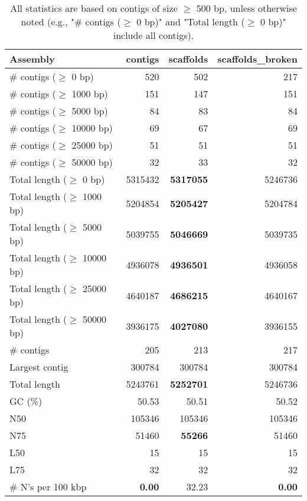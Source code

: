 \documentclass[12pt,a4paper]{article}
\begin{document}
\begin{table}[ht]
\begin{center}
\caption{All statistics are based on contigs of size $\geq$ 500 bp, unless otherwise noted (e.g., "\# contigs ($\geq$ 0 bp)" and "Total length ($\geq$ 0 bp)" include all contigs).}
\begin{tabular}{|l*{3}{|r}|}
\hline
Assembly & contigs & scaffolds & scaffolds\_broken \\ \hline
\# contigs ($\geq$ 0 bp) & 520 & 502 & 217 \\ \hline
\# contigs ($\geq$ 1000 bp) & 151 & 147 & 151 \\ \hline
\# contigs ($\geq$ 5000 bp) & 84 & 83 & 84 \\ \hline
\# contigs ($\geq$ 10000 bp) & 69 & 67 & 69 \\ \hline
\# contigs ($\geq$ 25000 bp) & 51 & 51 & 51 \\ \hline
\# contigs ($\geq$ 50000 bp) & 32 & 33 & 32 \\ \hline
Total length ($\geq$ 0 bp) & 5315432 & {\bf 5317055} & 5246736 \\ \hline
Total length ($\geq$ 1000 bp) & 5204854 & {\bf 5205427} & 5204784 \\ \hline
Total length ($\geq$ 5000 bp) & 5039755 & {\bf 5046669} & 5039735 \\ \hline
Total length ($\geq$ 10000 bp) & 4936078 & {\bf 4936501} & 4936058 \\ \hline
Total length ($\geq$ 25000 bp) & 4640187 & {\bf 4686215} & 4640167 \\ \hline
Total length ($\geq$ 50000 bp) & 3936175 & {\bf 4027080} & 3936155 \\ \hline
\# contigs & 205 & 213 & 217 \\ \hline
Largest contig & 300784 & 300784 & 300784 \\ \hline
Total length & 5243761 & {\bf 5252701} & 5246736 \\ \hline
GC (\%) & 50.53 & 50.51 & 50.52 \\ \hline
N50 & 105346 & 105346 & 105346 \\ \hline
N75 & 51460 & {\bf 55266} & 51460 \\ \hline
L50 & 15 & 15 & 15 \\ \hline
L75 & 32 & 32 & 32 \\ \hline
\# N's per 100 kbp & {\bf 0.00} & 32.23 & {\bf 0.00} \\ \hline
\end{tabular}
\end{center}
\end{table}
\end{document}
